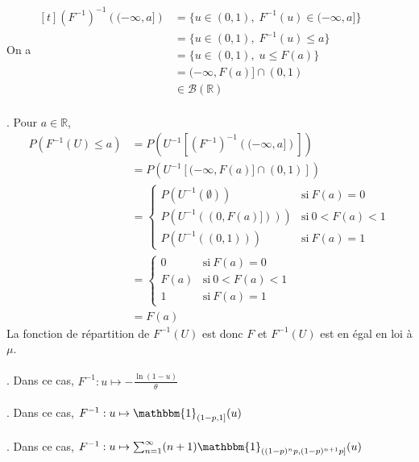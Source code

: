\documentclass{report}
\begin{document}
On a $\begin{aligned}[t] \left( F^{-1}\right)^{-1} \left((-\infty, a]\right)
&= \{u\in (0,1), \; F^{-1}(u)\in  (-\infty, a] \} \\
&= \{u\in (0,1), \; F^{-1}(u) \leq a \}\\
&= \{u\in (0,1), \; u \leq F(a) \}\\
&= (-\infty, F(a)] \cap (0,1) \\
&\in \mathcal B(\mathbb R)
\end{aligned}$ \\ \\
. Pour $a\in \mathbb R$, $$\begin{aligned}
P(F^{-1}(U)\leq a) &= P\left(U^{-1}\left[\left( F^{-1}\right)^{-1} \left((-\infty, a]\right)\right]\right) \\
&= P\left(U^{-1}\left[ (-\infty, F(a)] \cap (0,1) \right] \right) \\
&=\begin{cases}
      P\left(U^{-1}(\emptyset) \right) & \text{si}\ F(a)=0 \\
      P\left(U^{-1}((0,F(a)])) \right) & \text{si}\ 0<F(a)<1\\
      P\left(U^{-1}((0,1)) \right)& \text{si}\ F(a)=1
    \end{cases}\\
&= \begin{cases}
      0 & \text{si}\ F(a)=0 \\
      F(a)  & \text{si}\ 0<F(a)<1\\
      1 & \text{si}\ F(a)=1
    \end{cases}\\
&= F(a)
\end{aligned}$$
La fonction de répartition de $F^{-1}(U)$ est donc $F$ et $F^{-1}(U)$ est en égal en loi à $\mu$.\\ \\
. Dans ce cas, $F^{-1}:u\mapsto -\frac{\ln(1-u)}{\theta} $ \\ \\
. Dans ce cas, $F^{-1}:u\mapsto \mathbbm{1}_{(1-p,1]}(u) $ \\ \\
. Dans ce cas, $F^{-1}:u\mapsto \sum_{n=1}^\infty (n+1)\mathbbm{1}_{((1-p)^np,(1-p)^{n+1}p]}(u)$
\end{document}
